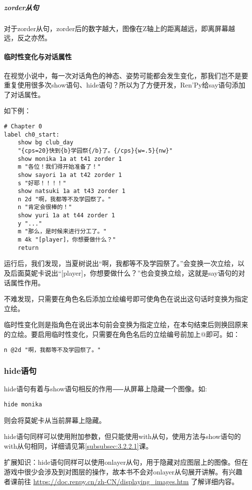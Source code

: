 \subparagraph{zorder从句}
对于zorder从句，zorder后的数字越大，图像在Z轴上的距离越远，即离屏幕越远，反之亦然。

\paragraph{临时性变化与对话属性}
在视觉小说中，每一次对话角色的神态、姿势可能都会发生变化，那我们岂不是要重复使用很多次show语句、hide语句？所以为了方便开发，Ren'Py给say语句添加了对话属性。

如下例：
\begin{lstlisting}
# Chapter 0
label ch0_start:
    show bg club_day
    "{cps=20}快到{b}学园祭{/b}了。{/cps}{w=.5}{nw}"
    show monika 1a at t41 zorder 1
    m "各位！我们得开始准备了！"
    show sayori 1a at t42 zorder 1
    s "好耶！！！！"
    show natsuki 1a at t43 zorder 1
    n 2d "啊，我都等不及学园祭了。"
    n "肯定会很棒的！"
    show yuri 1a at t44 zorder 1
    y "..."
    m "那么，是时候来进行分工了。"
    m 4k "[player]，你想要做什么？"
    return
\end{lstlisting}

运行后，我们发现，当夏树说出“啊，我都等不及学园祭了。”会变换一次立绘，以及后面莫妮卡说出“[player]，你想要做什么？”也会变换立绘，这就是say语句的对话属性作用。

不难发现，只需要在角色名后添加立绘编号即可使角色在说出这句话时变换为指定立绘。

临时性变化则是指角色在说出本句前会变换为指定立绘，在本句结束后则换回原来的立绘。要启用临时性变化，只需要在角色名后的立绘编号前加上@即可。如：
\begin{lstlisting}[numbers=none]
    n @2d "啊，我都等不及学园祭了。"
\end{lstlisting}

\subsubsection{hide语句}

hide语句有着与show语句相反的作用⸺从屏幕上隐藏一个图像。如:

\begin{lstlisting}[numbers=none]
hide monika
\end{lstlisting}

则会将莫妮卡从当前屏幕上隐藏。

hide语句同样可以使用附加参数，但只能使用with从句，使用方法与show语句的with从句相同，详细请见第\ref{subsubsec:3.2.2.1}课。

\begin{ExtraKnowledge}
    扩展知识：hide语句同样可以使用onlayer从句，用于隐藏对应图层上的图像。但在游戏中很少会涉及到对图层的操作，故本书不会对onlayer从句展开讲解。有兴趣者课前往 \url{https://doc.renpy.cn/zh-CN/displaying_images.htm} 了解详细内容。
\end{ExtraKnowledge}

